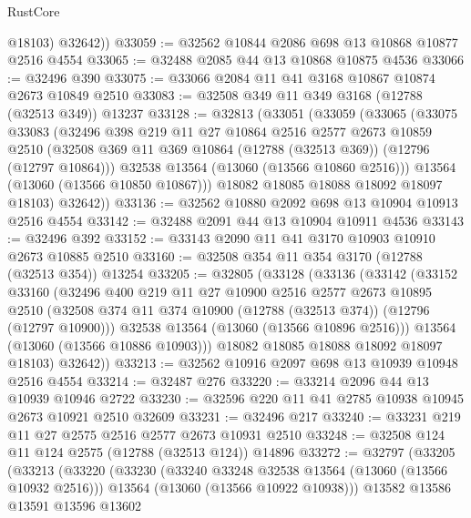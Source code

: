 \begin{lexlean}{RustCore}
\begin{coremodule}
          @18103)
        @32642))
@33059 := @32562 @10844 @2086 @698 @13 @10868 @10877 @2516 @4554
@33065 := @32488 @2085 @44 @13 @10868 @10875 @4536
@33066 := @32496 @390
@33075 := @33066 @2084 @11 @41 @3168 @10867 @10874 @2673 @10849 @2510
@33083 := @32508 @349 @11 @349 @3168 (@12788 (@32513 @349)) @13237
@33128 := @32813
    (@33051
      (@33059
        (@33065
          (@33075
            @33083
            (@32496
              @398
              @219
              @11
              @27
              @10864
              @2516
              @2577
              @2673
              @10859
              @2510
              (@32508 @369 @11 @369 @10864 (@12788 (@32513 @369)) (@12796 (@12797 @10864)))
              @32538
              @13564
              (@13060 (@13566 @10860 @2516)))
            @13564
            (@13060 (@13566 @10850 @10867)))
          @18082
          @18085
          @18088
          @18092
          @18097
          @18103)
        @32642))
@33136 := @32562 @10880 @2092 @698 @13 @10904 @10913 @2516 @4554
@33142 := @32488 @2091 @44 @13 @10904 @10911 @4536
@33143 := @32496 @392
@33152 := @33143 @2090 @11 @41 @3170 @10903 @10910 @2673 @10885 @2510
@33160 := @32508 @354 @11 @354 @3170 (@12788 (@32513 @354)) @13254
@33205 := @32805
    (@33128
      (@33136
        (@33142
          (@33152
            @33160
            (@32496
              @400
              @219
              @11
              @27
              @10900
              @2516
              @2577
              @2673
              @10895
              @2510
              (@32508 @374 @11 @374 @10900 (@12788 (@32513 @374)) (@12796 (@12797 @10900)))
              @32538
              @13564
              (@13060 (@13566 @10896 @2516)))
            @13564
            (@13060 (@13566 @10886 @10903)))
          @18082
          @18085
          @18088
          @18092
          @18097
          @18103)
        @32642))
@33213 := @32562 @10916 @2097 @698 @13 @10939 @10948 @2516 @4554
@33214 := @32487 @276
@33220 := @33214 @2096 @44 @13 @10939 @10946 @2722
@33230 := @32596 @220 @11 @41 @2785 @10938 @10945 @2673 @10921 @2510 @32609
@33231 := @32496 @217
@33240 := @33231 @219 @11 @27 @2575 @2516 @2577 @2673 @10931 @2510
@33248 := @32508 @124 @11 @124 @2575 (@12788 (@32513 @124)) @14896
@33272 := @32797
    (@33205
      (@33213
        (@33220
          (@33230
            (@33240 @33248 @32538 @13564 (@13060 (@13566 @10932 @2516)))
            @13564
            (@13060 (@13566 @10922 @10938)))
          @13582
          @13586
          @13591
          @13596
          @13602

\end{coremodule}
\end{lexlean}
